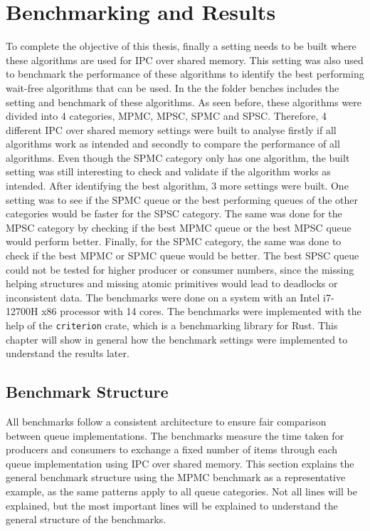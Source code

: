 \chapter{Benchmarking and Results}\label{ch:results}
To complete the objective of this thesis, finally a setting needs to be built where these algorithms are used for \ac{IPC} over shared memory. This setting was also used to benchmark the performance of these algorithms to identify the best performing wait-free algorithms that can be used. In the \cite{githubMA} the folder benches includes the setting and benchmark of these algorithms. As seen before, these algorithms were divided into 4 categories, \ac{MPMC}, \ac{MPSC}, \ac{SPMC} and \ac{SPSC}. Therefore, 4 different \ac{IPC} over shared memory settings were built to analyse firstly if all algorithms work as intended and secondly to compare the performance of all algorithms. Even though the \ac{SPMC} category only has one algorithm, the built setting was still interesting to check and validate if the algorithm works as intended. After identifying the best algorithm, 3 more settings were built. One setting was to see if the \ac{SPMC} queue or the best performing queues of the other categories would be faster for the \ac{SPSC} category. The same was done for the \ac{MPSC} category by checking if the best \ac{MPMC} queue or the best \ac{MPSC} queue would perform better. Finally, for the \ac{SPMC} category, the same was done to check if the best \ac{MPMC} or \ac{SPMC} queue would be better. The best \ac{SPSC} queue could not be tested for higher producer or consumer numbers, since the missing helping structures and missing atomic primitives would lead to deadlocks or inconsistent data. The benchmarks were done on a system with an Intel i7-12700H x86 processor with 14 cores. The benchmarks were implemented with the help of the \texttt{criterion} crate, which is a benchmarking library for Rust. This chapter will show in general how the benchmark settings were implemented to understand the results later.

\section{Benchmark Structure}
All benchmarks follow a consistent architecture to ensure fair comparison between queue implementations. The benchmarks measure the time taken for producers and consumers to exchange a fixed number of items through each queue implementation using \ac{IPC} over shared memory. This section explains the general benchmark structure using the \ac{MPMC} benchmark as a representative example, as the same patterns apply to all queue categories. Not all lines will be explained, but the most important lines will be explained to understand the general structure of the benchmarks. 

